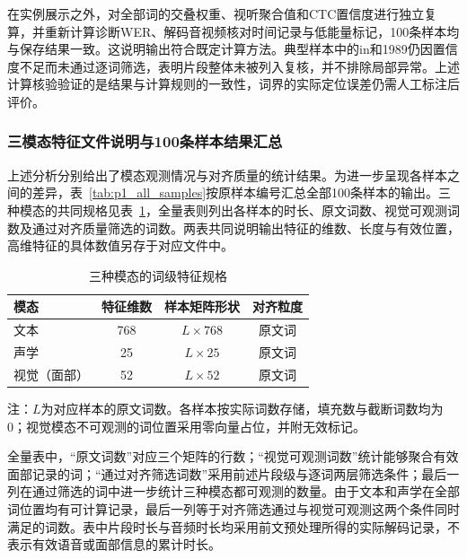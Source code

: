 在实例展示之外，对全部词的交叠权重、视听聚合值和CTC置信度进行独立复算，并重新计算诊断WER、解码音视频核对时间记录与低能量标记，100条样本均与保存结果一致。这说明输出符合既定计算方法。典型样本中的in和1989仍因置信度不足而未通过逐词筛选，表明片段整体未被列入复核，并不排除局部异常。上述计算核验验证的是结果与计算规则的一致性，词界的实际定位误差仍需人工标注后评价。


\subsubsection{三模态特征文件说明与100条样本结果汇总}
\label{sec:p1_delivery}

上述分析分别给出了模态观测情况与对齐质量的统计结果。为进一步呈现各样本之间的差异，表~\ref{tab:p1_all_samples}按原样本编号汇总全部100条样本的输出。三种模态的共同规格见表~\ref{tab:p1_feature_specification}，全量表则列出各样本的时长、原文词数、视觉可观测词数及通过对齐质量筛选的词数。两表共同说明输出特征的维数、长度与有效位置，高维特征的具体数值另存于对应文件中。

\begin{table}[H]
    \centering\small
    \caption{三种模态的词级特征规格}
    \label{tab:p1_feature_specification}
    \renewcommand{\arraystretch}{1.18}
    \begin{lrbox}{\pOneResultTableBox}
\begin{tabular}{@{}lccc@{}}
        \toprule
        模态 & 特征维数 & 样本矩阵形状 & 对齐粒度\\ \midrule
        文本 & 768 & $L\times768$ & 原文词\\
        声学 & 25 & $L\times25$ & 原文词\\
        视觉（面部） & 52 & $L\times52$ & 原文词\\ \bottomrule
    \end{tabular}
\end{lrbox}
\usebox{\pOneResultTableBox}
    \par\smallskip
    \parbox{\wd\pOneResultTableBox}{\footnotesize 注：$L$为对应样本的原文词数。各样本按实际词数存储，填充数与截断词数均为0；视觉模态不可观测的词位置采用零向量占位，并附无效标记。}
\end{table}

全量表中，“原文词数”对应三个矩阵的行数；“视觉可观测词数”统计能够聚合有效面部记录的词；“通过对齐筛选词数”采用前述片段级与逐词两层筛选条件；最后一列在通过筛选的词中进一步统计三种模态都可观测的数量。由于文本和声学在全部词位置均有可计算记录，最后一列等于对齐筛选通过与视觉可观测这两个条件同时满足的词数。表中片段时长与音频时长均采用前文预处理所得的实际解码记录，不表示有效语音或面部信息的累计时长。

